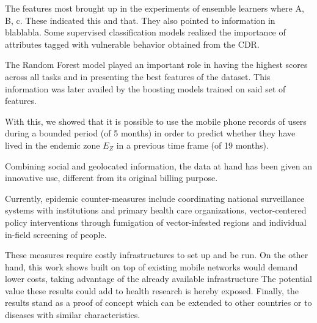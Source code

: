 The features most brought up in the experiments of ensemble learners where A, B, c.
These indicated this and that.
They also pointed to information in  blablabla.
Some supervised classification models realized the importance of attributes tagged with vulnerable behavior obtained from the CDR.\@

The Random Forest model played an important role in having the highest scores across all tasks and in presenting the best features of the dataset.
This information was later availed by the boosting models trained on said set of features.



With this, we showed that it is possible to use the mobile phone records of users during a bounded period (of 5 months) in order to predict whether they have lived in the endemic zone $E_Z$ in a previous time frame (of 19 months).

Combining social and geolocated information, the data at hand has been given an innovative use, different from its original billing purpose.



Currently, epidemic counter-measures include coordinating national surveillance systems with institutions and primary health care organizations, vector-centered policy interventions through fumigation of vector-infested regions and individual in-field screening of people.

These measures require costly infrastructures to set up and be run.
On the other hand, this work shows built on top of existing mobile networks would demand lower costs, taking advantage of the already available infrastructure
The potential value these results could add to health research is hereby exposed.
Finally, the results stand as a proof of concept which can be extended to other countries or to diseases with similar characteristics.


